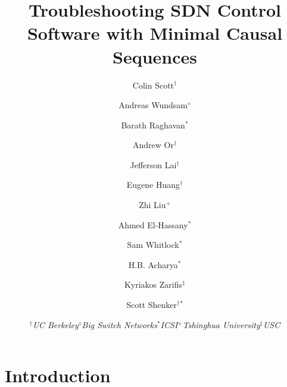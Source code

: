 \documentclass{sig-alternate-10pt}
\begin{document}
\title{Troubleshooting SDN Control Software with Minimal Causal Sequences}

\author{Colin Scott$^\dagger$ %
\and Andreas Wundsam$^\diamond$ %
\and Barath Raghavan$^*$
\and Andrew Or$^\dagger$ %
\and Jefferson Lai$^\dagger$
\and Eugene Huang$^\dagger$ %
\and Zhi Liu$^+$
\and Ahmed El-Hassany$^*$
\and Sam Whitlock$^*$ %
\and H.B. Acharya$^*$
\and Kyriakos Zarifis$^\ddagger$ %
\and Scott Shenker$^\dagger$$^*$ %
\and {\begin{tabular}{ccccc}$^\dagger${\large\it UC Berkeley} &
$^\diamond${\large\it Big Switch Networks} & $^*${\large\it ICSI} &
$^+${\large\it Tshinghua University} & $^\ddagger${\large\it USC}\end{tabular}}
}



   \date{}
   \maketitle
   \thispagestyle{empty}

%

\abstract{{\it }}

\section{Introduction}
\label{sec:intro}

\end{document}
